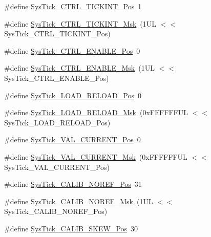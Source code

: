 \begin{DoxyCompactItemize}
\item 
\#define \mbox{\hyperlink{group___c_m_s_i_s___sys_tick_ga88f45bbb89ce8df3cd2b2613c7b48214}{Sys\+Tick\+\_\+\+C\+T\+R\+L\+\_\+\+T\+I\+C\+K\+I\+N\+T\+\_\+\+Pos}}~1
\item 
\#define \mbox{\hyperlink{group___c_m_s_i_s___sys_tick_ga95bb984266ca764024836a870238a027}{Sys\+Tick\+\_\+\+C\+T\+R\+L\+\_\+\+T\+I\+C\+K\+I\+N\+T\+\_\+\+Msk}}~(1\+U\+L $<$$<$ Sys\+Tick\+\_\+\+C\+T\+R\+L\+\_\+\+T\+I\+C\+K\+I\+N\+T\+\_\+\+Pos)
\item 
\#define \mbox{\hyperlink{group___c_m_s_i_s___sys_tick_ga0b48cc1e36d92a92e4bf632890314810}{Sys\+Tick\+\_\+\+C\+T\+R\+L\+\_\+\+E\+N\+A\+B\+L\+E\+\_\+\+Pos}}~0
\item 
\#define \mbox{\hyperlink{group___c_m_s_i_s___sys_tick_ga16c9fee0ed0235524bdeb38af328fd1f}{Sys\+Tick\+\_\+\+C\+T\+R\+L\+\_\+\+E\+N\+A\+B\+L\+E\+\_\+\+Msk}}~(1\+U\+L $<$$<$ Sys\+Tick\+\_\+\+C\+T\+R\+L\+\_\+\+E\+N\+A\+B\+L\+E\+\_\+\+Pos)
\item 
\#define \mbox{\hyperlink{group___c_m_s_i_s___sys_tick_gaf44d10df359dc5bf5752b0894ae3bad2}{Sys\+Tick\+\_\+\+L\+O\+A\+D\+\_\+\+R\+E\+L\+O\+A\+D\+\_\+\+Pos}}~0
\item 
\#define \mbox{\hyperlink{group___c_m_s_i_s___sys_tick_ga265912a7962f0e1abd170336e579b1b1}{Sys\+Tick\+\_\+\+L\+O\+A\+D\+\_\+\+R\+E\+L\+O\+A\+D\+\_\+\+Msk}}~(0x\+F\+F\+F\+F\+F\+F\+U\+L $<$$<$ Sys\+Tick\+\_\+\+L\+O\+A\+D\+\_\+\+R\+E\+L\+O\+A\+D\+\_\+\+Pos)
\item 
\#define \mbox{\hyperlink{group___c_m_s_i_s___sys_tick_ga3208104c3b019b5de35ae8c21d5c34dd}{Sys\+Tick\+\_\+\+V\+A\+L\+\_\+\+C\+U\+R\+R\+E\+N\+T\+\_\+\+Pos}}~0
\item 
\#define \mbox{\hyperlink{group___c_m_s_i_s___sys_tick_gafc77b56d568930b49a2474debc75ab45}{Sys\+Tick\+\_\+\+V\+A\+L\+\_\+\+C\+U\+R\+R\+E\+N\+T\+\_\+\+Msk}}~(0x\+F\+F\+F\+F\+F\+F\+U\+L $<$$<$ Sys\+Tick\+\_\+\+V\+A\+L\+\_\+\+C\+U\+R\+R\+E\+N\+T\+\_\+\+Pos)
\item 
\#define \mbox{\hyperlink{group___c_m_s_i_s___sys_tick_ga534dbe414e7a46a6ce4c1eca1fbff409}{Sys\+Tick\+\_\+\+C\+A\+L\+I\+B\+\_\+\+N\+O\+R\+E\+F\+\_\+\+Pos}}~31
\item 
\#define \mbox{\hyperlink{group___c_m_s_i_s___sys_tick_ga3af0d891fdd99bcc8d8912d37830edb6}{Sys\+Tick\+\_\+\+C\+A\+L\+I\+B\+\_\+\+N\+O\+R\+E\+F\+\_\+\+Msk}}~(1\+U\+L $<$$<$ Sys\+Tick\+\_\+\+C\+A\+L\+I\+B\+\_\+\+N\+O\+R\+E\+F\+\_\+\+Pos)
\item 
\#define \mbox{\hyperlink{group___c_m_s_i_s___sys_tick_gadd0c9cd6641b9f6a0c618e7982954860}{Sys\+Tick\+\_\+\+C\+A\+L\+I\+B\+\_\+\+S\+K\+E\+W\+\_\+\+Pos}}~30
$$
\end{DoxyCompactItemize}
